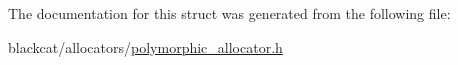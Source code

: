 The documentation for this struct was generated from the following file\+:\begin{DoxyCompactItemize}
\item 
blackcat/allocators/\hyperlink{polymorphic__allocator_8h}{polymorphic\+\_\+allocator.\+h}\end{DoxyCompactItemize}
